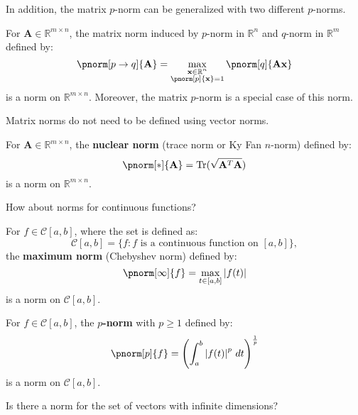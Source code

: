 \documentclass{huhtakm-template-book-v2}
\DeclareMathOperator{\Tr}{Tr}
\begin{document}
    In addition, the matrix $p$-norm can be generalized with two different $p$-norms.
    \begin{eg}
        For $\mathbf{A} \in \mathbb{R}^{m \times n}$, the matrix norm induced by $p$-norm in $\mathbb{R}^{n}$ and $q$-norm in $\mathbb{R}^{m}$ defined by:
        \begin{equation*}
            \pnorm[p \to q]{\mathbf{A}} = \max_{\substack{\mathbf{x} \in \mathbb{R}^{n}\\\pnorm[p]{\mathbf{x}} = 1}}\pnorm[q]{\mathbf{Ax}}
        \end{equation*}
        is a norm on $\mathbb{R}^{m \times n}$. Moreover, the matrix $p$-norm is a special case of this norm.
    \end{eg}
    Matrix norms do not need to be defined using vector norms.
    \begin{eg}
        For $\mathbf{A} \in \mathbb{R}^{m \times n}$, the \textbf{nuclear norm} (trace norm or Ky Fan $n$-norm) defined by:
        \begin{equation*}
            \pnorm[*]{\mathbf{A}} = \Tr(\sqrt{\mathbf{A}^{T}\mathbf{A}})
        \end{equation*}
        is a norm on $\mathbb{R}^{m \times n}$.
    \end{eg}
    How about norms for continuous functions?
    \begin{eg}
        For $f \in \mathcal{C}[a, b]$, where the set is defined as:
        \begin{equation*}
            \mathcal{C}[a, b] = \{f : f \text{ is a continuous function on } [a, b]\},
        \end{equation*}
        the \textbf{maximum norm} (Chebyshev norm) defined by:
        \begin{equation*}
            \pnorm[\infty]{f} = \max_{t \in [a, b]}\abs{f(t)}
        \end{equation*}
        is a norm on $\mathcal{C}[a, b]$.
    \end{eg}
    \begin{eg}
        For $f \in \mathcal{C}[a, b]$, the \textbf{$p$-norm} with $p\geq 1$ defined by:
        \begin{equation*}
            \pnorm[p]{f} = \left(\int_{a}^{b}\abs{f(t)}^{p}\,dt\right)^{\frac{1}{p}}
        \end{equation*}
        is a norm on $\mathcal{C}[a, b]$.
    \end{eg}
    Is there a norm for the set of vectors with infinite dimensions?
\end{document}
